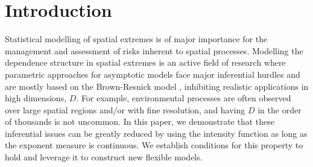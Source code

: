 \documentclass[12pt]{article}
\begin{document}
\baselineskip=25pt

\section{Introduction}

Statistical modelling of spatial extremes is of major importance for the management and assessment of risks inherent to spatial processes. Modelling the dependence structure in spatial extremes is an active field of research where parametric approaches for asymptotic models face major inferential hurdles and are mostly based on the Brown-Resnick model \citep{Brown.Resnick:1977, Kabluchko.etal:2009}, inhibiting realistic applications in high dimensions, $D$. For example, environmental processes are often observed over large spatial regions and/or with fine resolution, and having $D$ in the order of thousands is not uncommon. In this paper, we demonstrate that these inferential issues can be greatly reduced by using the intensity function as long as the exponent measure is continuous. We establish conditions for this property to hold and leverage it to construct new flexible models. 
\end{document}
